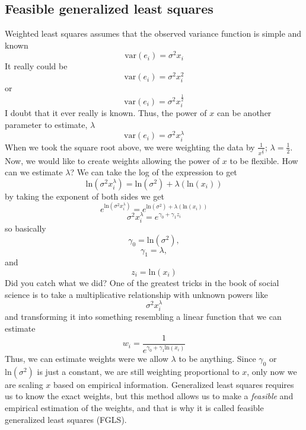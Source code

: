 \subsection{Feasible generalized least squares}

Weighted least squares assumes that the observed variance function is simple and known
\[
\mbox{var}\left(e_i\right)=\sigma^2x_i
\]
It really could be
\[
\mbox{var}\left(e_i\right)=\sigma^2x_i^2
\]
or
\[
\mbox{var}\left(e_i\right)=\sigma^2x_i^{\frac{1}{2}}
\]
I doubt that it ever really is known. Thus, the power of $x$ can be another parameter to estimate, $\lambda$
\begin{equation}
\mbox{var}\left(e_i\right)=\sigma^2x_i^{\lambda}
\end{equation}
When we took the square root above, we were weighting the data by $\frac{1}{x^{\frac{1}{2}}}$; $\lambda = \frac{1}{2}$. Now, we would like to create weights allowing the power of $x$ to be flexible. How can we estimate $\lambda$? We can take the log of the expression to get
\begin{equation}
\mbox{ln}\left(\sigma^2x_i^{\lambda}\right)=\mbox{ln}\left(\sigma^2\right)+\lambda\left(\mbox{ln}\left(x_i\right)\right)
\end{equation}
by taking the exponent of both sides we get
\[
e^{\mbox{ln}\left(\sigma^2x_i^{\lambda}\right)}=e^{\mbox{ln}\left(\sigma^2\right)+\lambda\left(\mbox{ln}\left(x_i\right)\right)}
\]
\begin{equation}
\sigma^2x_i^{\lambda}=e^{\gamma_0+\gamma_1z_i}
\end{equation}
so basically
\[
\gamma_0 = \mbox{ln}\left(\sigma^2\right),
\]
\[
\gamma_1 = \lambda,
\]
and
\[
z_i=\mbox{ln}\left(x_i\right)
\]
Did you catch what we did? One of the greatest tricks in the book of social science is to take a multiplicative relationship with unknown powers like
\[
\sigma^2x_i^{\lambda}
\]
and transforming it into something resembling a linear function that we can estimate
\begin{equation}
w_i=\frac{1}{e^{\gamma_0+\gamma_1\mbox{ln}\left(x_i\right)}}
\end{equation}
Thus, we can estimate weights were we allow $\lambda$ to be anything. Since $\gamma_0$ or $\mbox{ln}\left(\sigma^2\right)$ is just a constant, we are still weighting proportional to $x$, only now we are scaling $x$ based on empirical information. Generalized least squares requires us to know the exact weights, but this method allows us to make a {\it feasible} and empirical estimation of the weights, and that is why it is called feasible generalized least squares (FGLS).

